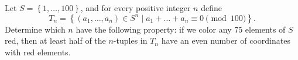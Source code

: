 Let $S=\left\{1,\ldots,100\right\}$, and for every positive integer $n$ define \[T_n=\left\{\left(a_1,\ldots,a_n\right)\in S^n\mid a_1+\ldots+a_n\equiv0\pmod{100}\right\}.\] Determine which $n$ have the following property: if we color any $75$ elements of $S$ red, then at least half of the $n$-tuples in $T_n$ have an even number of coordinates with red elements.
